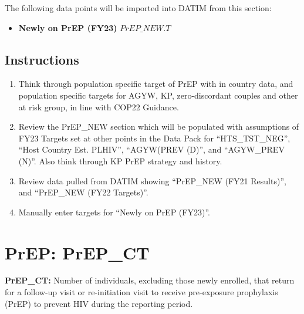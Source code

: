\documentclass[
  openany]{book}
\providecommand{\tightlist}{%
  \setlength{\itemsep}{0pt}\setlength{\parskip}{0pt}}
\begin{document}
The following data points will be imported into DATIM from this section:

\begin{itemize}
\tightlist
\item
  \textbf{Newly on PrEP (FY23)} \(PrEP\_NEW.T\)
\end{itemize}

\hypertarget{instructions-58}{%
\subsection{Instructions}\label{instructions-58}}

\begin{enumerate}
\def\labelenumi{\arabic{enumi}.}
\item
  Think through population specific target of PrEP with in country
  data, and population specific targets for AGYW, KP, zero-discordant
  couples and other at risk group, in line with COP22 Guidance.
\item
  Review the PrEP\_NEW section which will be populated with assumptions
  of FY23 Targets set at other points in the Data Pack for
  ``HTS\_TST\_NEG'', ``Host Country Est. PLHIV'', ``AGYW(PREV (D)'', and
  ``AGYW\_PREV (N)''. Also think through KP PrEP strategy and history.
\item
  Review data pulled from DATIM showing ``PrEP\_NEW (FY21 Results)'', and
  ``PrEP\_NEW (FY22 Targets)''.
\item
  Manually enter targets for ``Newly on PrEP (FY23)''.
\end{enumerate}

\hypertarget{prep-prep_ct}{%
\section{PrEP: PrEP\_CT}\label{prep-prep_ct}}

\textbf{PrEP\_CT:} Number of individuals, excluding those newly enrolled, that
return for a follow-up visit or re-initiation visit to receive
pre-exposure prophylaxis (PrEP) to prevent HIV during the reporting
period.
\end{document}
